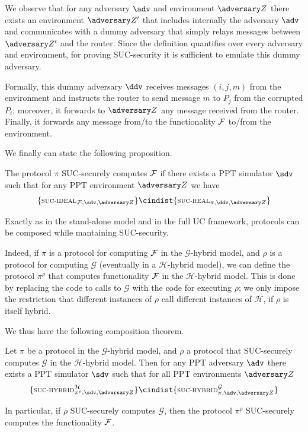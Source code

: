 We observe that for any adversary $\adv$ and environment $\zdv$ there exists an environment $\zdv'$ that includes internally the adversary $\adv$ and communicates with a dummy adversary that simply relays messages between $\zdv'$ and the router. Since the definition quantifies over every adversary and environment, for proving SUC-security it is sufficient to emulate this dummy adversary.

Formally, this dummy adversary $\ddv$ receives messages $(i,j,m)$ from the environment and instructs the router to send message $m$ to $P_j$ from the corrupted $P_i$; moreover, it forwards to $\zdv$ any message received from the router. Finally, it forwards any message from/to the functionality $\mathcal{F}$ to/from the environment.

We finally can state the following proposition.
\begin{proposition}
    The protocol $\pi$ SUC-securely computes $\mathcal{F}$ if there exists a PPT simulator $\sdv$ such that for any PPT environment $\zdv$ we have 
    $$ \{ \textsc{\scriptsize SUC-IDEAL}_{\Fun, \sdv, \zdv} \} \cindist \{ \textsc{\scriptsize SUC-REAL}_{\pi, \ddv, \zdv} \}$$
\end{proposition}

Exactly as in the stand-alone model and in the full UC framework, protocols can be composed while mantaining SUC-security.

Indeed, if $\pi$ is a protocol for computing $\mathcal{F}$ in the $\mathcal G$-hybrid model, and $\rho$ is a protocol for computing $\mathcal G$ (eventually in a $\mathcal H$-hybrid model), we can define the protocol $\pi^\rho$ that computes functionality $\mathcal{F}$ in the $\mathcal H$-hybrid model. This is done by replacing the code to calls to $\mathcal G$ with the code for executing $\rho$; we only impose the restriction that different instances of $\rho$ call different instances of $\mathcal H$, if $\rho$ is itself hybrid.

We thus have the following composition theorem.
\begin{theorem}
    Let $\pi$ be a protocol in the $\mathcal G$-hybrid model, and $\rho$ a protocol that SUC-securely computes $\mathcal G$ in the $\mathcal H$-hybrid model. Then for any PPT adversary $\adv$ there exists a PPT simulator $\sdv$ such that for all PPT environments $\zdv$
    $$ \{ \textsc{\scriptsize SUC-HYBRID}^{\mathcal H}_{\pi^{\rho}, \sdv, \zdv} \} \cindist \{ \textsc{\scriptsize SUC-HYBRID}^{\mathcal G}_{\pi, \adv, \zdv} \}$$
    
    In particular, if $\rho$ SUC-securely computes $\mathcal G$, then the protocol $\pi^\rho$ SUC-securely computes the functionality $\mathcal{F}$.
\end{theorem}

